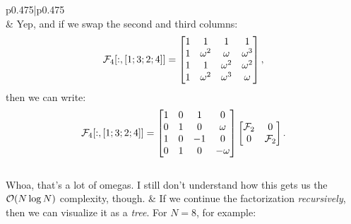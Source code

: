 \documentclass[11pt,letterpaper]{article}
\begin{document}
\begin{longtable}{p{}|p{}}
\[\]
& Yep, and if we swap the second and third columns:
\[
\mathcal{F}_4[:,[1;3;2;4]] = \begin{bmatrix}
1 & 1 & 1 & 1\\
1 & \omega^2 & \omega & \omega^3\\
1 & 1 & \omega^2 & \omega^2\\
1 & \omega^2 & \omega^3 & \omega
\end{bmatrix},
\]
then we can write:
\[
\mathcal{F}_4[:,[1;3;2;4]] = \begin{bmatrix}
1 & 0 & 1 & 0\\
0 & 1 & 0 & \omega\\
1 & 0 & -1 & 0\\
0 & 1 & 0 & -\omega\\
\end{bmatrix}
\begin{bmatrix}
\mathcal{F}_2 & 0\\
0 & \mathcal{F}_2\\
\end{bmatrix}.
\]\\
\hline
Whoa, that's a lot of omegas. I still don't understand how this gets us the $\mathcal{O}(N\log N)$ complexity, though. & If we continue the factorization {\em recursively}, then we can visualize it as a {\em tree}. For $N=8$, for example:


\end{longtable}
\end{document}
